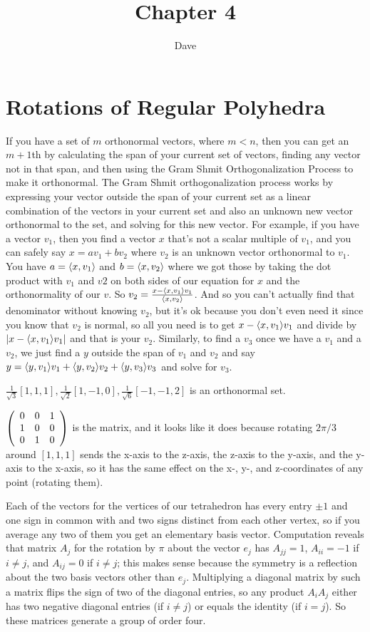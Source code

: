 \documentclass[11pt, oneside]{article}   	%
\title{Chapter 4}
\author{Dave}
\begin{document}
\maketitle

\section{Rotations of Regular Polyhedra}
\be
\item \be
\item If you have a set of $m$ orthonormal vectors, where $m < n$, then you can get an $m+1$th by calculating the span of your current set of vectors, finding any vector not in that span, and then using the Gram Shmit Orthogonalization Process to make it orthonormal. The Gram Shmit orthogonalization process works by expressing your vector outside the span of your current set as a linear combination of the vectors in your current set and also an unknown new vector orthonormal to the set, and solving for this new vector. For example, if you have a vector $v_1$, then you find a vector $x$ that's not a scalar multiple of $v_1$, and you can safely say $x = a v_1 + bv_2$ where $v_2$ is an unknown vector orthonormal to $v_1$. You have $a = \langle x, v_1 \rangle$ and $b = \langle x, v_2 \rangle$ where we got those by taking the dot product with $v_1$ and $v2$ on both sides of our equation for $x$ and the orthonormality of our $v$. So $v_2 = \frac{x - \langle x, v_1 \rangle v_1}{\langle x, v_2 \rangle}$. And so you can't actually find that denominator without knowing $v_2$, but it's ok because you don't even need it since you know that $v_2$ is normal, so all you need is to get $x - \langle x, v_1 \rangle v_1$ and divide by $|x - \langle x, v_1 \rangle v_1|$ and that is your $v_2$. Similarly, to find a $v_3$ once we have a $v_1$ and a $v_2$, we just find a $y$ outside the span of $v_1$ and $v_2$ and say $y = \langle y, v_1 \rangle v_1 + \langle y, v_2 \rangle v_2 + \langle y, v_3 \rangle v_3$ and solve for $v_3$.
\item $\frac{1}{\sqrt{3}}[1, 1, 1], \frac{1}{\sqrt{2}}[1, -1, 0], \frac{1}{\sqrt{6}}[-1, -1, 2]$ is an orthonormal set.
\item $\left( \begin{array}{ccc} 0 & 0 & 1 \\ 1 & 0 & 0 \\ 0 & 1 & 0 \end{array} \right)$ is the matrix, and it looks like it does because rotating $2\pi/3$ around $[1, 1, 1]$ sends the x-axis to the z-axis, the z-axis to the y-axis, and the y-axis to the x-axis, so it has the same effect on the x-, y-, and z-coordinates of any point (rotating them).
\ee
\item Each of the vectors for the vertices of our tetrahedron has every entry $\pm 1$ and one sign in common with and two signs distinct from each other vertex, so if you average any two of them you get an elementary basis vector. Computation reveals that matrix $A_j$ for the rotation by $\pi$ about the vector $e_j$ has $A_{jj} = 1$, $A_{ii} = -1$ if $i \not = j$, and $A_{ij} = 0$ if $i \not = j$; this makes sense because the symmetry is a reflection about the two basis vectors other than $e_j$. Multiplying a diagonal matrix by such a matrix flips the sign of two of the diagonal entries, so any product $A_iA_j$ either has two negative diagonal entries (if $i \not = j$) or equals the identity (if $i=j$). So these matrices generate a group of order four. 
\end{document}

